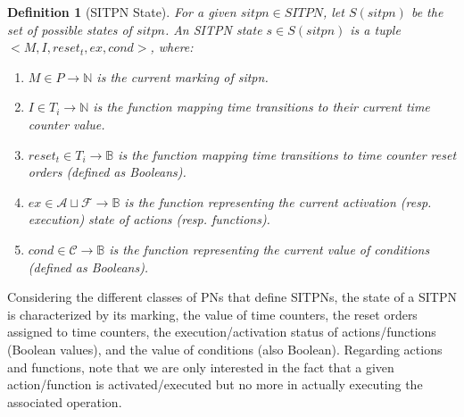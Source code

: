 \documentclass[pdflatex,sn-mathphys]{sn-jnl}%
\theoremstyle{thmstyleone}%
\theoremstyle{thmstyletwo}%
\theoremstyle{thmstylethree}%
\newtheorem{definition}{Definition}%
\begin{document}
\begin{definition}[SITPN State]
  \label{def:sitpnstate}
  For a given $sitpn\in{}SITPN$, let $S(sitpn)$ be the set of possible
  states of $sitpn$. An SITPN state $s\in{}S(sitpn)$ is a tuple
  ${<}M,I,reset_t,ex,cond{>}$, where:
  \begin{enumerate}
  \item $M\in{}P\rightarrow\mathbb{N}$ is the current marking of sitpn.
  \item\label{item:sitpn-state-tc} $I\in{}T_i{}\rightarrow\mathbb{N}$
    is the function mapping time transitions to their current time
    counter value.
  \item\label{item:sitpn-state-rst}
    $reset_t\in{}T_i\rightarrow\mathbb{B}$ is the function mapping
    time transitions to time counter reset orders (defined as
    Booleans).
  \item $ex\in{}\mathcal{A}\sqcup\mathcal{F}\rightarrow\mathbb{B}$ is
    the function representing the current activation (resp. execution)
    state of actions (resp. functions).
  \item $cond\in\mathcal{C}\rightarrow\mathbb{B}$ is the function representing the
    current value of conditions (defined as Booleans).
  \end{enumerate}
\end{definition}

Considering the different classes of PNs that define SITPNs, the state
of a SITPN is characterized by its marking, the value of time
counters, the reset orders assigned to time counters, the
execution/activation status of actions/functions (Boolean values), and
the value of conditions (also Boolean). Regarding actions and
functions, note that we are only interested in the fact that a given
action/function is activated/executed but no more in actually
executing the associated operation. 


\end{document}
